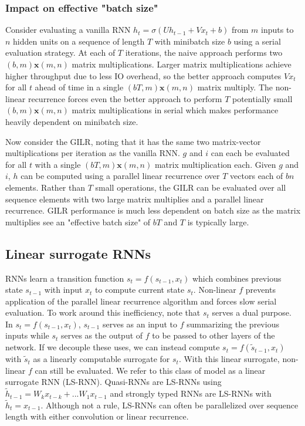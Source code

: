 \documentclass{article}
\begin{document}
\subsubsection{Impact on effective "batch size"}
Consider evaluating a vanilla RNN $h_t = \sigma(Uh_{t-1} + Vx_t + b)$ from $m$ inputs to $n$ hidden units on a sequence of length $T$ with minibatch size $b$ using a  serial evaluation strategy. At each of $T$ iterations, the naive approach performs two $(b, m) \mathbf{x} (m, n)$ matrix multiplications. Larger matrix multiplications achieve higher throughput due to less IO overhead, so the better approach computes $Vx_t$ for all $t$ ahead of time in a single $(bT, m) \mathbf{x} (m, n)$ matrix multiply. The non-linear recurrence forces even the better approach to perform $T$ potentially small $(b, m) \mathbf{x} (m, n)$ matrix multiplications in serial which makes performance heavily dependent on minibatch size.

Now consider the GILR, noting that it has the same two matrix-vector multiplications per iteration as the vanilla RNN. $g$ and $i$ can each be evaluated for all $t$ with a single $(bT, m) \mathbf{x} (m, n)$ matrix multiplication each. Given $g$ and $i$, $h$ can be computed using a parallel linear recurrence over $T$ vectors each of $bn$ elements. Rather than $T$ small operations, the GILR can be evaluated over all sequence elements with two large matrix multiplies and a parallel linear recurrence. GILR performance is much less dependent on batch size as the matrix multiplies see an "effective batch size" of $bT$ and $T$ is typically large.

\subsection{Linear surrogate RNNs}
RNNs learn a transition function $s_t = f(s_{t-1}, x_t)$ which combines previous state $s_{t-1}$ with input $x_t$ to compute current state $s_t$. Non-linear $f$ prevents application of the parallel linear recurrence algorithm and forces slow serial evaluation. To work around this inefficiency, note that $s_t$ serves a dual purpose. In $s_t = f(s_{t-1}, x_t)$, $s_{t-1}$ serves as an input to $f$ summarizing the previous inputs while $s_t$ serves as the output of $f$ to be passed to other layers of the network. If we decouple these uses, we can instead compute $s_t = f(\tilde{s}_{t-1}, x_t)$ with $\tilde{s}_t$ as a linearly computable surrogate for $s_t$. With this linear surrogate, non-linear $f$ can still be evaluated. We refer to this class of model as a linear surrogate RNN (LS-RNN). Quasi-RNNs \cite{bradbury2017quasi} are LS-RNNs using $\tilde{h}_{t-1} = W_k x_{t-k} + ... W_1 x_{t-1}$
and strongly typed RNNs\cite{balduzzi2016strongly} are LS-RNNs with $\tilde{h}_t=x_{t-1}$. Although not a rule, LS-RNNs can often be parallelized over sequence length with either
convolution or linear recurrence.
\end{document}
